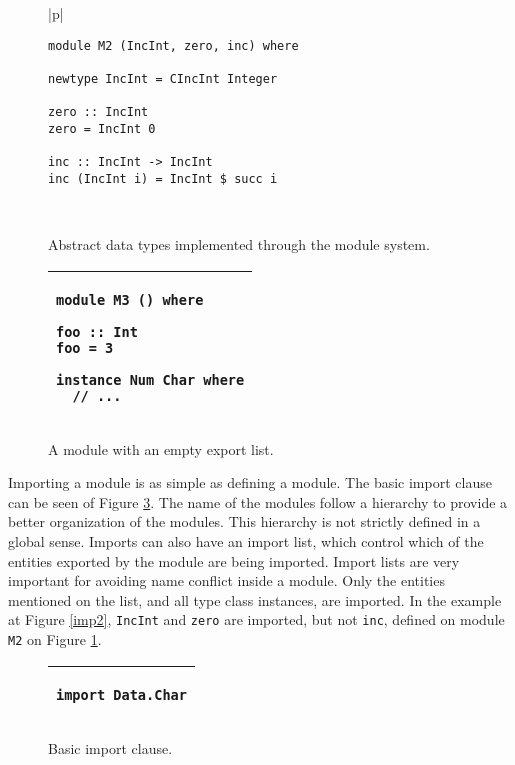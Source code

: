\documentclass[msc]{ppgccufmg}
\begin{document}
\begin{figure}
\caption{Abstract data types implemented through the module system.\label{m2}}
\begin{tabular}{|p{\textwidth}|}
\hline
\begin{verbatim}
module M2 (IncInt, zero, inc) where

newtype IncInt = CIncInt Integer

zero :: IncInt
zero = IncInt 0

inc :: IncInt -> IncInt
inc (IncInt i) = IncInt $ succ i
\end{verbatim}
\\
\hline
\end{tabular}
\end{figure}

\begin{figure}
\caption{A module with an empty export list.\label{m3}}
\begin{tabular}{|p{\textwidth}|}
\hline
\begin{verbatim}
module M3 () where

foo :: Int
foo = 3

instance Num Char where
  // ...
\end{verbatim}
\\
\hline
\end{tabular}
\end{figure}

Importing a module is as simple as defining a module.
The basic import clause can be seen of Figure \ref{imp1}.
The name of the modules follow a hierarchy to provide a better organization of the modules.
This hierarchy is not strictly defined in a global sense.
Imports can also have an import list, which control which of the entities exported by the module are being imported.
Import lists are very important for avoiding name conflict inside a module.
Only the entities mentioned on the list, and all type class instances, are imported.
In the example at Figure \ref{imp2}, \texttt{IncInt} and \texttt{zero} are imported, but not \texttt{inc}, defined on module \texttt{M2} on Figure \ref{m2}.

\begin{figure}
\caption{Basic import clause.\label{imp1}}
\begin{tabular}{|p{\textwidth}|}
\hline
\begin{verbatim}
import Data.Char
\end{verbatim}
\\
\hline
\end{tabular}
\end{figure}
\end{document}
